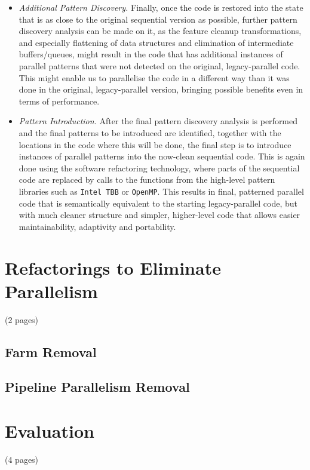 \documentclass{llncs}
\begin{document}
\begin{itemize}
\item \emph{Additional Pattern Discovery.} Finally, once the code is restored into the state that is as close to the original sequential version as possible, further pattern discovery analysis can be made on it, as the feature cleanup transformations, and especially flattening of data structures and elimination of intermediate buffers/queues, might result in the code that has additional instances of parallel patterns that were not detected on the original, legacy-parallel code. This might enable us to parallelise the code in a different way than it was done in the original, legacy-parallel version, bringing possible benefits even in terms of performance.

\item \emph{Pattern Introduction.} After the final pattern discovery analysis is performed and the final patterns to be introduced are identified, together with the locations in the code where this will be done, the final step is to introduce instances of parallel patterns into the now-clean sequential code. This is again done using the software refactoring technology, where parts of the sequential code are replaced by calls to the functions from the high-level pattern libraries such as \lstinline{Intel TBB} or \lstinline{OpenMP}. This results in final, patterned parallel code that is semantically equivalent to the starting legacy-parallel code, but with much cleaner structure and simpler, higher-level code that allows easier maintainability, adaptivity and portability.
\end{itemize}

\section{Refactorings to Eliminate Parallelism} (2 pages)
\subsection{Farm Removal}
\subsection{Pipeline Parallelism Removal}

\section{Evaluation} (4 pages)
\end{document}
